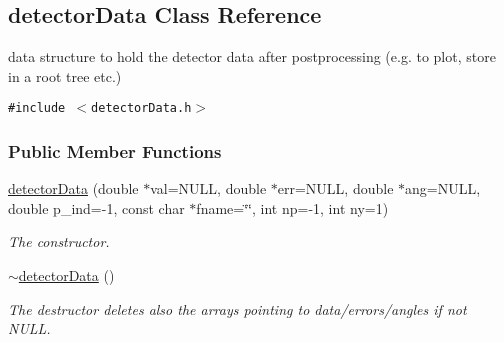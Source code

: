 \hypertarget{classdetectorData}{
\subsection{detector\-Data Class Reference}
\label{classdetectorData}
}
data structure to hold the detector data after postprocessing (e.g. to plot, store in a root tree etc.)  


{\tt \#include $<$detector\-Data.h$>$}

\subsubsection*{Public Member Functions}
\begin{CompactItemize}
\item 
\hyperlink{classdetectorData_3f8538f5f634295fc40682b8aed47b31}{detector\-Data} (double $\ast$val=NULL, double $\ast$err=NULL, double $\ast$ang=NULL, double p\_\-ind=-1, const char $\ast$fname=\char`\"{}\char`\"{}, int np=-1, int ny=1)
\begin{CompactList}\small\item\em The constructor. \item\end{CompactList}\item 
\hyperlink{classdetectorData_d32a037cc2bd6e8caf4556cbd4b88ec7}{$\sim$detector\-Data} ()
\begin{CompactList}\small\item\em The destructor deletes also the arrays pointing to data/errors/angles if not NULL. \item\end{CompactList}\end{CompactItemize}
